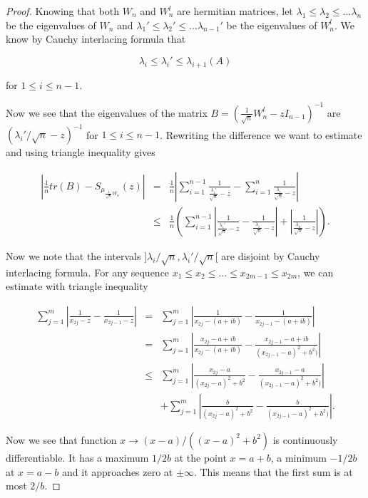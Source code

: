 \documentclass[12pt,a4paper,leqno]{report}
\theoremstyle{plain}
\theoremstyle{definition}
\theoremstyle{remark}
\begin{document}
\begin{proof}
Knowing that both $W_n$ and $W_n^l$ are hermitian matrices, let $\lambda_1 \leq \lambda_2 \leq \ldots \lambda_n$ be the eigenvalues of $W_n$ and $\lambda_1' \leq \lambda_2' \leq \ldots \lambda_{n-1}'$ be the eigenvalues of $W_n^l$. We know by Cauchy interlacing formula that

\begin{equation*}
\lambda_{i} \leq \lambda_{i}' \leq \lambda_{i+1} (A)
\end{equation*}

for $1\leq i \leq n-1$.

Now we see that the eigenvalues of the matrix $B = (\frac{1}{\sqrt{n}}W_n^l-zI_{n-1})^{-1}$ are $(\lambda_i'/\sqrt{n}-z)^{-1}$ for $1\leq i \leq n-1$. Rewriting the difference we want to estimate and using triangle inequality gives

\begin{eqnarray*}
\left|\frac{1}{n}tr(B) - S_{\mu_{\frac{1}{\sqrt{n}}W_n}}(z)\right| & = & \frac{1}{n}
\left|\sum_{i=1}^{n-1} \frac{1}{\frac{\lambda_i'}{\sqrt{n}}-z} - \sum_{i=1}^{n} \frac{1}{\frac{\lambda_i}{\sqrt{n}}-z}\right|\\
& \leq & \frac{1}{n} \left(
\sum_{i=1}^{n-1} \left|\frac{1}{\frac{\lambda_i'}{\sqrt{n}}-z} - \frac{1}{\frac{\lambda_i}{\sqrt{n}}-z}\right| + \left|\frac{1}{\frac{\lambda_n}{\sqrt{n}}-z}\right| \right).
\end{eqnarray*}

Now we note that the intervals $]\lambda_i/\sqrt{n},\lambda_i'/\sqrt{n}[$ are disjoint by Cauchy interlacing formula. For any sequence $x_1 \leq x_2 \leq ... \leq x_{2m-1} \leq x_{2m}$, we can estimate with triangle inequality

\begin{eqnarray*}
\sum_{j=1}^{m} \left|\frac{1}{x_{2j}-z} - \frac{1}{x_{2j-1}-z}\right| & = &
\sum_{j=1}^{m} \left|\frac{1}{x_{2j}-(a+ib)} - \frac{1}{x_{2j-1}-(a+ib)}\right|\\
& = & \sum_{j=1}^{m} \left|\frac{x_{2j}-a+ib}{x_{2j}-(a+ib)} - \frac{x_{2j-1}-a+ib}{(x_{2j-1}-a)^2+b^2)}\right|\\
& \leq & \sum_{j=1}^{m} \left|\frac{x_{2j}-a}{(x_{2j}-a)^2+b^2} - \frac{x_{2j-1}-a}{(x_{2j-1}-a)^2+b^2)}\right| \\
&  &+ \sum_{j=1}^{m} \left|\frac{b}{(x_{2j}-a)^2+b^2} - \frac{b}{(x_{2j-1}-a)^2+b^2)}\right|.
\end{eqnarray*}

Now we see that function $x \to (x-a)/((x-a)^2+b^2)$ is continuously differentiable. It has a maximum $1/2b$ at the point $x=a+b$, a minimum $-1/2b$ at $x=a-b$ and it approaches zero at $\pm \infty$. This means that the first sum is at most $2/b$.


\end{proof}
\end{document}
